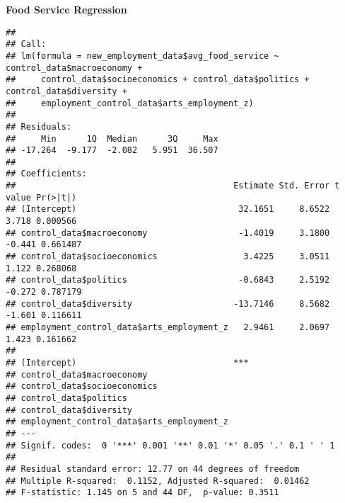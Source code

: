 \documentclass[
]{article}
\newenvironment{Shaded}{\begin{snugshade}}{\end{snugshade}}
\newcommand{\CommentTok}[1]{\textcolor[rgb]{0.56,0.35,0.01}{\textit{#1}}}
\newcommand{\FunctionTok}[1]{\textcolor[rgb]{0.13,0.29,0.53}{\textbf{#1}}}
\newcommand{\NormalTok}[1]{#1}
\newcommand{\OtherTok}[1]{\textcolor[rgb]{0.56,0.35,0.01}{#1}}
\newcommand{\SpecialCharTok}[1]{\textcolor[rgb]{0.81,0.36,0.00}{\textbf{#1}}}
\begin{document}
\textbf{Food Service Regression}

\begin{Shaded}
\end{Shaded}

\begin{verbatim}
## 
## Call:
## lm(formula = new_employment_data$avg_food_service ~ control_data$macroeconomy + 
##     control_data$socioeconomics + control_data$politics + control_data$diversity + 
##     employment_control_data$arts_employment_z)
## 
## Residuals:
##     Min      1Q  Median      3Q     Max 
## -17.264  -9.177  -2.082   5.951  36.507 
## 
## Coefficients:
##                                           Estimate Std. Error t value Pr(>|t|)
## (Intercept)                                32.1651     8.6522   3.718 0.000566
## control_data$macroeconomy                  -1.4019     3.1800  -0.441 0.661487
## control_data$socioeconomics                 3.4225     3.0511   1.122 0.268068
## control_data$politics                      -0.6843     2.5192  -0.272 0.787179
## control_data$diversity                    -13.7146     8.5682  -1.601 0.116611
## employment_control_data$arts_employment_z   2.9461     2.0697   1.423 0.161662
##                                              
## (Intercept)                               ***
## control_data$macroeconomy                    
## control_data$socioeconomics                  
## control_data$politics                        
## control_data$diversity                       
## employment_control_data$arts_employment_z    
## ---
## Signif. codes:  0 '***' 0.001 '**' 0.01 '*' 0.05 '.' 0.1 ' ' 1
## 
## Residual standard error: 12.77 on 44 degrees of freedom
## Multiple R-squared:  0.1152, Adjusted R-squared:  0.01462 
## F-statistic: 1.145 on 5 and 44 DF,  p-value: 0.3511
\end{verbatim}
\end{document}
